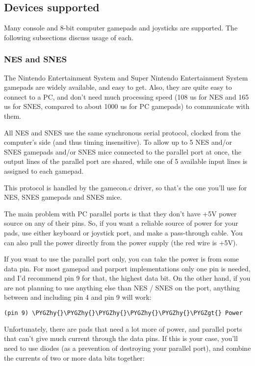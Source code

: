 \documentclass[a4paper,8pt,english]{sphinxmanual}
\def\PYGZgt{\char`\>}
\def\PYGZhy{\char`\-}
\begin{document}
\subsection{Devices supported}
\label{input/devices/joystick-parport:devices-supported}
Many console and 8-bit computer gamepads and joysticks are supported. The
following subsections discuss usage of each.


\subsubsection{NES and SNES}
\label{input/devices/joystick-parport:nes-and-snes}
The Nintendo Entertainment System and Super Nintendo Entertainment System
gamepads are widely available, and easy to get. Also, they are quite easy to
connect to a PC, and don't need much processing speed (108 us for NES and
165 us for SNES, compared to about 1000 us for PC gamepads) to communicate
with them.

All NES and SNES use the same synchronous serial protocol, clocked from
the computer's side (and thus timing insensitive). To allow up to 5 NES
and/or SNES gamepads and/or SNES mice connected to the parallel port at once,
the output lines of the parallel port are shared, while one of 5 available
input lines is assigned to each gamepad.

This protocol is handled by the gamecon.c driver, so that's the one
you'll use for NES, SNES gamepads and SNES mice.

The main problem with PC parallel ports is that they don't have +5V power
source on any of their pins. So, if you want a reliable source of power
for your pads, use either keyboard or joystick port, and make a pass-through
cable. You can also pull the power directly from the power supply (the red
wire is +5V).

If you want to use the parallel port only, you can take the power is from
some data pin. For most gamepad and parport implementations only one pin is
needed, and I'd recommend pin 9 for that, the highest data bit. On the other
hand, if you are not planning to use anything else than NES / SNES on the
port, anything between and including pin 4 and pin 9 will work:

\begin{Verbatim}[commandchars=\\\{\}]
(pin 9) \PYGZhy{}\PYGZhy{}\PYGZhy{}\PYGZhy{}\PYGZhy{}\PYGZgt{} Power
\end{Verbatim}

Unfortunately, there are pads that need a lot more of power, and parallel
ports that can't give much current through the data pins. If this is your
case, you'll need to use diodes (as a prevention of destroying your parallel
port), and combine the currents of two or more data bits together:
\end{document}
